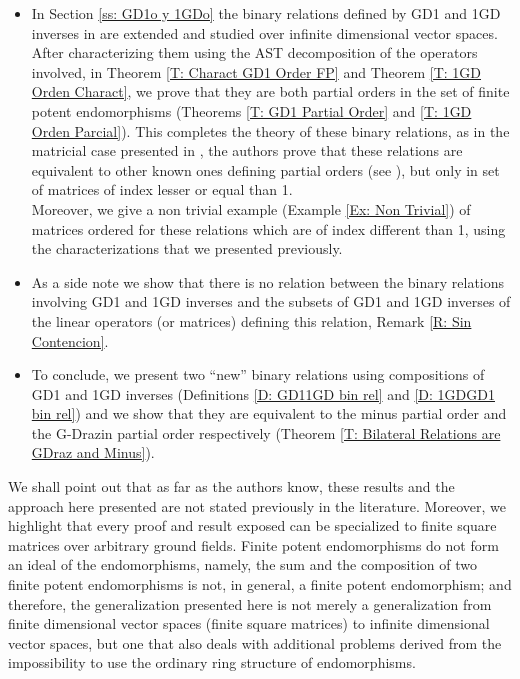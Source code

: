 \documentclass[10pt,a4paper]{amsart}
\theoremstyle{plain}
\theoremstyle{remark}
\numberwithin{equation}{section} \numberwithin{defn}{section}
\begin{document}
\begin{itemize}
\item In Section \ref{ss: GD1o y 1GDo} the binary relations defined by GD1 and 1GD inverses in \cite{GD1N} are extended and studied over infinite dimensional vector spaces. After characterizing them using the AST decomposition of the operators involved, in Theorem \ref{T: Charact GD1 Order FP} and Theorem \ref{T: 1GD Orden Charact}, we prove that they are both partial orders in the set of finite potent endomorphisms (Theorems \ref{T: GD1 Partial Order} and \ref{T: 1GD Orden Parcial}). This completes the theory of these binary relations, as in the matricial case presented in \cite{GD1N}, the authors prove that these relations are equivalent to other known ones defining partial orders (see \cite[Theorem 2.14, Theorem 3.14]{GD1N}), but only in set of matrices of index lesser or equal than 1.\\Moreover, we give a non trivial example (Example \ref{Ex: Non Trivial}) of matrices ordered for these relations which are of index different than 1, using the characterizations that we presented previously.

\item As a side note we show that there is no relation between the binary relations involving GD1 and 1GD inverses and the subsets of GD1 and 1GD inverses of the linear operators (or matrices) defining this relation, Remark \ref{R: Sin Contencion}.

\item To conclude, we present two ``new'' binary relations using compositions of GD1 and 1GD inverses (Definitions \ref{D: GD11GD bin rel} and \ref{D: 1GDGD1 bin rel}) and we show that they are equivalent to the minus partial order and the G-Drazin partial order respectively (Theorem \ref{T: Bilateral Relations are GDraz and Minus}).

\end{itemize}

We shall point out that as far as the authors know, these results and the approach here presented are not stated previously in the literature. Moreover, we highlight that every proof and result exposed can be specialized to finite square matrices over arbitrary ground fields. Finite potent endomorphisms do not form an ideal of the endomorphisms, namely, the sum and the composition of two finite potent endomorphisms is not, in general, a finite potent endomorphism; and therefore, the generalization presented here is not merely a generalization from finite dimensional vector spaces (finite square matrices) to infinite dimensional vector spaces, but one that also deals with additional problems derived from the impossibility to use the ordinary ring structure of endomorphisms.
\end{document}
